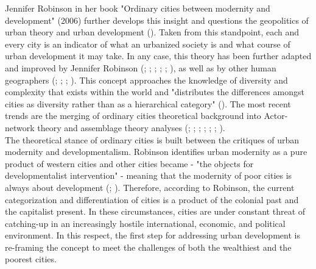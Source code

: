 \documentclass[11pt]{report}
\begin{document}
{{{Jennifer Robinson in her book "Ordinary cities between modernity and development" (2006) further develops this insight and questions the geopolitics of urban theory and urban development (\href{ref}{\citealt{fraser_globalization_2006}}). Taken from this standpoint, each and every city is an indicator of what an urbanized society is and what course of urban development it may take.
In any case, this theory has been further adapted and improved by Jennifer Robinson
(\href{Robinson}{\citealt{robinson_global_2002}}; \href{Robinson}{\citealt{robinson_ordinary_2006}}; \href{Robinson}{\citealt{robinson_cities_2011}}; \href{Robinson}{\citealt{robinson_urban_2013}}; \href{Robinson}{\citealt{robinson_comparative_2015}}; \href{Robinson}{\citealt{robinson_thinking_2016}}),
as well as by other human geographers
(\href{Amin}{\citealt{amin_ordinary_1997}}; \href{Roy}{\citealt{roy_urbanisms_2011}}; \href{Roy}{\citealt{roy_worlding_2011}}; \href{Parnell}{\citealt{parnell_retheorizing_2012}}).
This concept approaches the knowledge of diversity and complexity that exists within the world and "distributes the differences amongst cities as diversity rather than as a hierarchical category" (\href{ref}{\citealt{robinson_global_2002}}).
The most recent trends are the merging of ordinary cities theoretical background into Actor-network theory and assemblage theory analyses
(\href{ONg}{\citealt{collier_global_2008}}; \href{Robinson}{\citealt{Robinson2004}};
\href{Sassen}{\citealt{Sassen2008}}; \href{McFarlane}{\citealt{McFarlane2010}}; \href{Farias}{\citealt{farias_introduction:_2011}}; \href{Rankin}{\citealt{rankin_assemblage_2011}};
\href{Scott}{\citealt{scott_nature_2015}}).
\\

The theoretical stance of ordinary cities is built between the critiques of urban modernity and developmentalism.
Robinson identifies urban modernity as a pure product of western cities and other cities became - "the objects for developmentalist intervention" - meaning that the modernity of poor cities is always about development (\href{Robinson}{\citealt{robinson_global_2002}}; \href{Robinson}{\citealt{robinson_ordinary_2006}}).
Therefore, according to Robinson, the current categorization and differentiation of cities is a product of the colonial past and the capitalist present. In these circumstances, cities are under constant threat of catching-up in an increasingly hostile international, economic, and political environment. In this respect, the first step for addressing urban development is re-framing the concept to meet the challenges of both the wealthiest and the poorest cities.
\\

}}}
\end{document}
